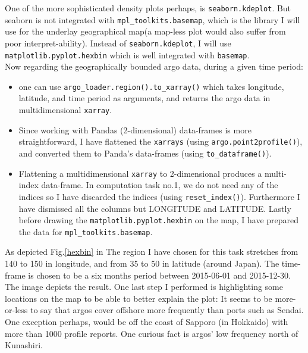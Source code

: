 \documentclass[12pt]{article}
\begin{document}
One of the more sophisticated density plots perhaps, is 
\verb|seaborn.kdeplot|. 
But seaborn is not integrated with \verb|mpl_toolkits.basemap|,
which is the library I will use for the underlay geographical 
map(a map-less plot would also suffer from poor interpret-ability). 
Instead of \verb|seaborn.kdeplot|, I will use 
\verb|matplotlib.pyplot.hexbin| which
is well integrated with \verb|basemap|.\\

Now regarding the geographically bounded argo data, 
during a given time period:
 \begin{itemize}
     \item one can use \verb|argo_loader.region().to_xarray()| which takes longitude, latitude, and time period as arguments, and 
     returns the argo data in multidimensional \verb|xarray|.
     \item Since working
     with Pandas (2-dimensional) data-frames is more straightforward, 
     I have flattened the \verb|xarrays| 
     (using \verb|argo.point2profile()|),
     and converted them to Panda's data-frames 
     (using \verb|to_dataframe()|).
     \item Flattening a multidimensional \verb|xarray| to 
     2-dimensional produces a multi-index data-frame. 
     In computation task no.1, 
     we do not need any of the indices so I have discarded 
     the indices (using \verb|reset_index()|). Furthermore I 
     have dismissed all
     the columns but LONGITUDE and LATITUDE. 
     Lastly before 
     drawing the \verb|matplotlib.pyplot.hexbin| on the map, I have
     prepared the data for \verb|mpl_toolkits.basemap|.
 \end{itemize}

 As depicted Fig.\ref{hexbin} in The region I have chosen for 
 this task stretches from 140 to 150 
 in longitude, and from 35 to 50 in latitude (around Japan). 
 The time-frame is chosen to be a six months period between 
 2015-06-01 and 2015-12-30. The image depicts the result. One
 last step I performed is highlighting some locations on the map 
 to be able to better explain the plot: It seems to be
 more-or-less to say that argos cover offshore more frequently 
 than ports such as Sendai. One exception perhaps, would be
 off the coast of Sapporo (in Hokkaido) with more than 1000 profile 
 reports. One curious fact is argos' low frequency north of Kunashiri.    
\end{document}
